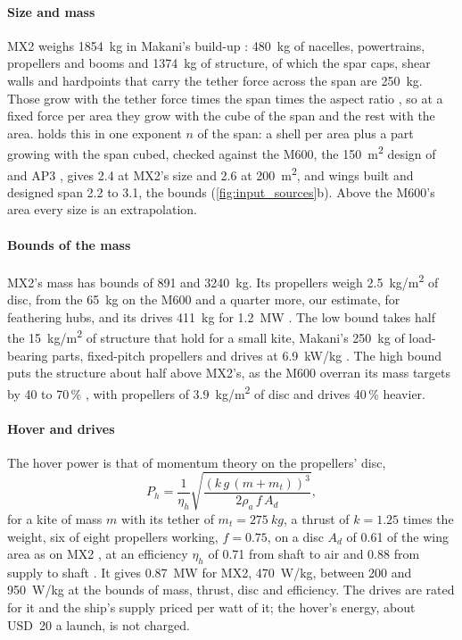 \paragraph{Size and mass} MX2 weighs \SI{1854}{kg} in Makani's build-up \citep{echeverri2020part2}: \SI{480}{kg} of nacelles, powertrains, propellers and booms and \SI{1374}{kg} of structure, of which the spar caps, shear walls and hardpoints that carry the tether force across the span are \SI{250}{kg}. Those grow with the tether force times the span times the aspect ratio \citep{aull2020}, so at a fixed force per area they grow with the cube of the span and the rest with the area.  holds this in one exponent $n$ of the span: a shell per area plus a part growing with the span cubed, checked against the M600, the \SI{150}{m^2} design of \citet{eijkelhof2020reference} and AP3 \citep{vanhagen2023}, gives 2.4 at MX2's size and 2.6 at \SI{200}{m^2}, and wings built and designed span 2.2 to 3.1, the bounds (\cref{fig:input_sources}b). Above the M600's area every size is an extrapolation.

\paragraph{Bounds of the mass} MX2's mass has bounds of 891 and \SI{3240}{kg}. Its propellers weigh \SI{2.5}{kg/m^2} of disc, from the \SI{65}{kg} on the M600 \citep{echeverri2020part2,echeverri2020part1} and a quarter more, our estimate, for feathering hubs, and its drives \SI{411}{kg} for \SI{1.2}{MW} \citep{echeverri2020part1}. The low bound takes half the \SI{15}{kg/m^2} of structure that \citet{aull2020} hold for a small kite, Makani's \SI{250}{kg} of load-bearing parts, fixed-pitch propellers and drives at 6.9~kW/kg \citep{johnson2018}. The high bound puts the structure about half above MX2's, as the M600 overran its mass targets by 40 to 70\,\% \citep{echeverri2020part1}, with propellers of \SI{3.9}{kg/m^2} of disc and drives 40\,\% heavier.

\paragraph{Hover and drives} The hover power is that of momentum theory on the propellers' disc,
\begin{equation}
P_h = \frac{1}{\eta_h}\sqrt{\frac{\left(k\,g\,(m + m_t)\right)^3}{2\rho_a\, f\, A_d}},
\label{eq:hover_power}
\end{equation}
for a kite of mass $m$ with its tether of $m_t=\SI{275}{kg}$, a thrust of $k=1.25$ times the weight, six of eight propellers working, $f=0.75$, on a disc $A_d$ of 0.61 of the wing area as on MX2 \citep{echeverri2020part1}, at an efficiency $\eta_h$ of 0.71 from shaft to air and 0.88 from supply to shaft \citep{makani2020code}. It gives \SI{0.87}{MW} for MX2, \SI{470}{W/kg}, between 200 and \SI{950}{W/kg} at the bounds of mass, thrust, disc and efficiency. The drives are rated for it and the ship's supply priced per watt of it; the hover's energy, about USD~20 a launch, is not charged.

